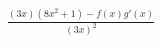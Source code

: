 \documentclass[preview]{standalone}
\begin{document}
\begin{align*}
\frac{(3x)(8x^2+1)-f(x)g'(x)}{(3x)^2}
\end{align*}
\end{document}
